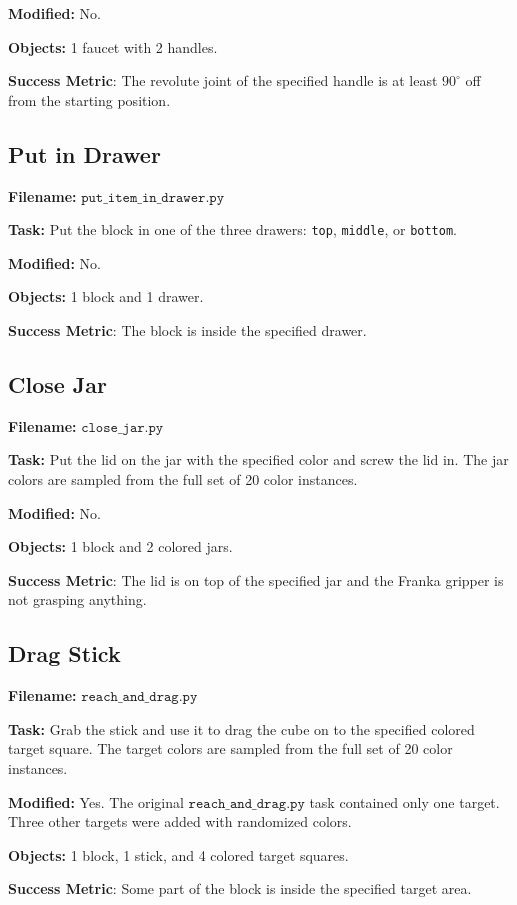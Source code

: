 \documentclass{article}
\begin{document}
\textbf{Modified:} No.

\textbf{Objects:} 1 faucet with 2 handles.

\textbf{Success Metric}: The revolute joint of the specified handle is at least $90^\circ$ off from the starting position. 

\subsection{Put in Drawer}
\textbf{Filename:} $\texttt{put\_item\_in\_drawer.py}$ 

\textbf{Task:} Put the block in one of the three drawers: \texttt{top}, \texttt{middle}, or \texttt{bottom}.

\textbf{Modified:} No.

\textbf{Objects:} 1 block and 1 drawer.

\textbf{Success Metric}: The block is inside the specified drawer.

\subsection{Close Jar}
\textbf{Filename:} $\texttt{close\_jar.py}$ 

\textbf{Task:} Put the lid on the jar with the specified color and screw the lid in. The jar colors are sampled from the full set of 20 color instances.

\textbf{Modified:} No.

\textbf{Objects:} 1 block and 2 colored jars. 

\textbf{Success Metric}: The lid is on top of the specified jar and the Franka gripper is not grasping anything.

\subsection{Drag Stick}
\textbf{Filename:} $\texttt{reach\_and\_drag.py}$ 

\textbf{Task:} Grab the stick and use it to drag the cube on to the specified colored target square. The target colors are sampled from the full set of 20 color instances. 

\textbf{Modified:} Yes. The original $\texttt{reach\_and\_drag.py}$ task contained only one target. Three other targets were added with randomized colors.

\textbf{Objects:} 1 block, 1 stick, and 4 colored target squares.

\textbf{Success Metric}: Some part of the block is inside the specified target area.
\end{document}
